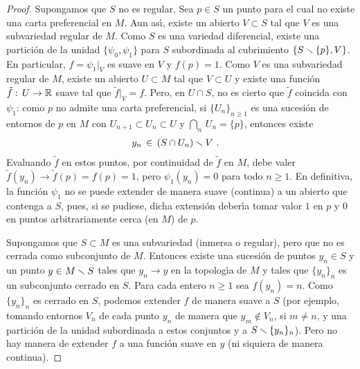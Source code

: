 \begin{proof}
	Supongamos que $S$ no es regular. Sea $p\in S$ un punto para
	el cual no existe una carta preferencial en $M$. Aun as\'{\i},
	existe un abierto $V\subset S$ tal que $V$ es una subvariedad
	regular de $M$. Como $S$ es una variedad diferencial, existe
	una partici\'{o}n de la unidad $\{\psi_{0},\psi_{1}\}$ para
	$S$ subordinada al cubrimiento $\{S\smallsetminus\{p\},V\}$. En particular,
	$f=\psi_{1}|_{V}$ es suave en $V$ y $f(p)=1$. Como $V$ es una
	subvariedad regular de $M$, existe un abierto $U\subset M$ tal que
	$V\subset U$ y existe una funci\'{o}n $\tilde{f}:\,U\rightarrow\mathbb{R}$
	suave tal que $\tilde{f}|_{V}=f$. Pero, en $U\cap S$, no es cierto
	que $\tilde{f}$ coincida con $\psi_{1}$: como $p$ no admite una
	carta preferencial, si $\{U_{n}\}_{n\geq 1}$ es una sucesi\'{o}n
	de entornos de $p$ en $M$ con $U_{n+1}\subset U_{n}\subset U$ y
	$\bigcap_{n}\,U_{n}=\{p\}$, entonces existe
	\begin{align*}
		y_{n} & \,\in\, (S\cap U_{n})\smallsetminus V
		\text{ .}
	\end{align*}
	Evaluando $\tilde{f}$ en estos puntos, por continuidad de $\tilde{f}$
	en $M$, debe valer $\tilde{f}(y_{n})\to \tilde{f}(p)=f(p)=1$, pero
	$\psi_{1}(y_{n})=0$ para todo $n\geq 1$. En definitiva, la funci\'{o}n
	$\psi_{1}$ no se puede extender de manera suave (continua) a un
	abierto que contenga a $S$, pues, si se pudiese, dicha extensi\'{o}n
	deber\'{\i}a tomar valor $1$ en $p$ y $0$ en puntos arbitrariamente
	cerca (en $M$) de $p$.

	Supongamos que $S\subset M$ es una subvariedad (inmersa o regular),
	pero que no es cerrada como subconjunto de $M$. Entonces existe una
	sucesi\'{o}n de puntos $y_{n}\in S$ y un punto $y\in M\smallsetminus S$
	tales que $y_{n}\to y$ en la topolog\'{\i}a de $M$ y tales que
	$\{y_{n}\}_{n}$ es un subconjunto cerrado en $S$. Para cada
	entero $n\geq 1$ sea $f(y_{n})=n$. Como $\{y_{n}\}_{n}$ es cerrado
	en $S$, podemos extender $f$ de manera suave a $S$ (por ejemplo,
	tomando entornos $V_{n}$ de cada punto $y_{n}$ de manera que
	$y_{m}\not\in V_{n}$, si $m\not =n$, y una partici\'{o}n
	de la unidad subordinada a estos conjuntos y a
	$S\smallsetminus\{y_{n}\}_{n}$). Pero no hay manera de extender $f$ a una
	funci\'{o}n suave en $y$ (ni siquiera de manera continua).
\end{proof}

